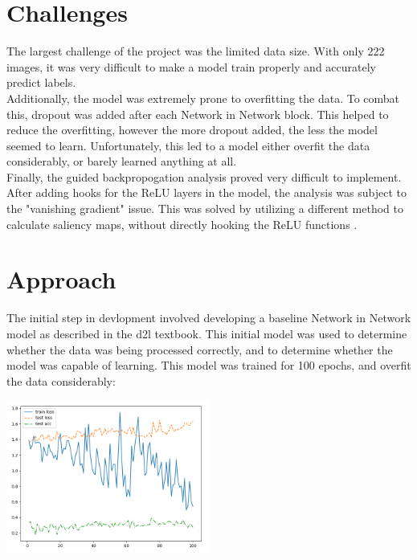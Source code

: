 \documentclass{article}[12pt]
\begin{document}
\section*{Challenges}

\indent
The largest challenge of the project was the limited data size. With only 222 images, it was very difficult to make a model train properly and accurately predict labels.\\
\indent
Additionally, the model was extremely prone to overfitting the data. To combat this, dropout was added after each Network in Network block. This helped to reduce the overfitting, however the more dropout added, the less the model seemed to learn. Unfortunately, this led to a model either overfit the data considerably, or barely learned anything at all.\\
\indent
Finally, the guided backpropogation analysis proved very difficult to implement. After adding hooks for the ReLU layers in the model, the analysis was subject to the "vanishing gradient" issue. This was solved by utilizing a different method to calculate saliency maps, without directly hooking the ReLU functions \cite{saliency}.\\



\section*{Approach}

\indent
The initial step in devlopment involved developing a baseline Network in Network model as described in the d2l textbook. This initial model was used to determine whether the data was being processed correctly, and to determine whether the model was capable of learning. This model was trained for 100 epochs, and overfit the data considerably: \\

\begin{center}
    \includegraphics[width=0.5\textwidth]{images/basic_model.png}
\end{center}
\end{document}
